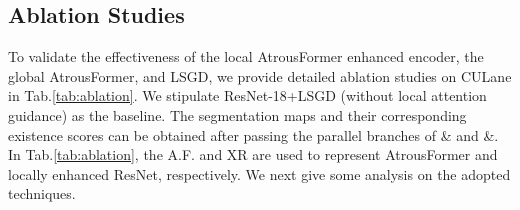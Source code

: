 \documentclass[preprint,12pt,review]{elsarticle}
\begin{document}
\subsection{Ablation Studies}
 To validate the effectiveness of the local AtrousFormer enhanced encoder, the global AtrousFormer, and LSGD, we provide detailed ablation studies on CULane in Tab.\ref{tab:ablation}. We stipulate ResNet-18+LSGD (without local attention guidance) as the baseline. The segmentation maps and their corresponding existence scores can be obtained after passing the parallel branches of  \& and  \&. In Tab.\ref{tab:ablation}, the A.F. and XR are used to represent AtrousFormer and locally enhanced ResNet, respectively. We next give some analysis on the adopted techniques.

\begin{table}
	\centering
	\caption{Ablation studies on the test set of CULane against , Precision, and Recall metrics.}
	\label{tab:ablation}
\end{table}
\end{document}
